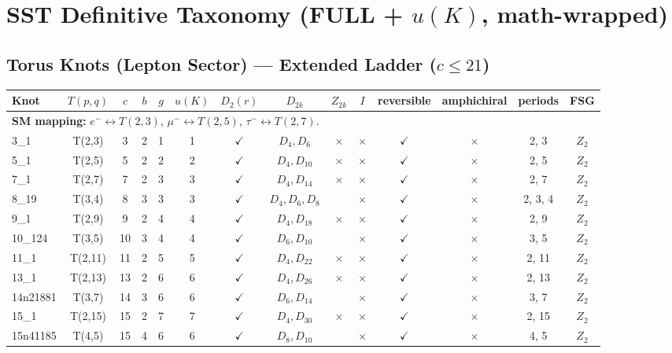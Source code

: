 \documentclass[a4paper,11pt]{article}
\begin{document}
\section*{SST Definitive Taxonomy (FULL + $u(K)$, math-wrapped)}
\subsection*{Torus Knots (Lepton Sector) — Extended Ladder ($c\le 21$)}
\begin{longtable}{lccccccccccccc}
\toprule
Knot & $T(p,q)$ & $c$ & $b$ & $g$ & $u(K)$ & $D_2(r)$ & $D_{2k}$ & $Z_{2k}$ & $I$ & reversible & amphichiral & periods & FSG \\
\midrule
\multicolumn{14}{l}{\textbf{SM mapping:} $e^- \leftrightarrow T(2,3)$, $\mu^- \leftrightarrow T(2,5)$, $\tau^- \leftrightarrow T(2,7)$.} \\ \hline
3\_1 & T(2,3) & 3 & 2 & 1 & 1 & $\checkmark$ & $D_4, D_{6}$ & $\times$ & $\times$ & $\checkmark$ & $\times$ & 2, 3 & $Z_2$ \\
5\_1 & T(2,5) & 5 & 2 & 2 & 2 & $\checkmark$ & $D_4, D_{10}$ & $\times$ & $\times$ & $\checkmark$ & $\times$ & 2, 5 & $Z_2$ \\
7\_1 & T(2,7) & 7 & 2 & 3 & 3 & $\checkmark$ & $D_4, D_{14}$ & $\times$ & $\times$ & $\checkmark$ & $\times$ & 2, 7 & $Z_2$ \\
8\_19 & T(3,4) & 8 & 3 & 3 & 3 & $\checkmark$ & $D_4, D_6, D_8$ &  & $\times$ & $\checkmark$ & $\times$ & 2, 3, 4 & $Z_2$ \\
9\_1 & T(2,9) & 9 & 2 & 4 & 4 & $\checkmark$ & $D_4, D_{18}$ & $\times$ & $\times$ & $\checkmark$ & $\times$ & 2, 9 & $Z_2$ \\
10\_124 & T(3,5) & 10 & 3 & 4 & 4 & $\checkmark$ & $D_6, D_{10}$ &  & $\times$ & $\checkmark$ & $\times$ & 3, 5 & $Z_2$ \\
11\_1 & T(2,11) & 11 & 2 & 5 & 5 & $\checkmark$ & $D_4, D_{22}$ & $\times$ & $\times$ & $\checkmark$ & $\times$ & 2, 11 & $Z_2$ \\
13\_1 & T(2,13) & 13 & 2 & 6 & 6 & $\checkmark$ & $D_4, D_{26}$ & $\times$ & $\times$ & $\checkmark$ & $\times$ & 2, 13 & $Z_2$ \\
14n21881 & T(3,7) & 14 & 3 & 6 & 6 & $\checkmark$ & $D_6, D_{14}$ &  & $\times$ & $\checkmark$ & $\times$ & 3, 7 & $Z_2$ \\
15\_1 & T(2,15) & 15 & 2 & 7 & 7 & $\checkmark$ & $D_4, D_{30}$ & $\times$ & $\times$ & $\checkmark$ & $\times$ & 2, 15 & $Z_2$ \\
15n41185 & T(4,5) & 15 & 4 & 6 & 6 & $\checkmark$ & $D_8, D_{10}$ &  & $\times$ & $\checkmark$ & $\times$ & 4, 5 & $Z_2$ \\

\end{longtable}
\end{document}
